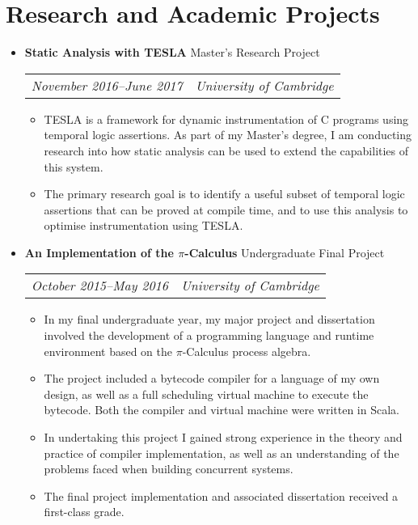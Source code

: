 \documentclass[letterpaper]{article}
\begin{document}
\section*{Research and Academic Projects}
  \begin{itemize}
    \item \textbf{Static Analysis with TESLA} Master's Research Project \\
      \begin{tabular}{c|c}
        \emph{November 2016--June 2017} & \emph{University of Cambridge}
      \end{tabular}
      \begin{itemize}
        \item TESLA is a framework for dynamic instrumentation of C programs
          using temporal logic assertions. As part of my Master's degree, I am
          conducting research into how static analysis can be used to extend the
          capabilities of this system.

        \item The primary research goal is to identify a useful subset of
          temporal logic assertions that can be proved at compile time, and to
          use this analysis to optimise instrumentation using TESLA.
      \end{itemize}

    \item \textbf{An Implementation of the $\pi$-Calculus} Undergraduate Final
      Project \\
        \begin{tabular}{c|c}
            \emph{October 2015--May 2016} & \emph{University of Cambridge}
        \end{tabular}
        \begin{itemize}
            \item In my final undergraduate year, my major project and
              dissertation involved the development of a programming language
              and runtime environment based on the $\pi$-Calculus process
              algebra.

            \item The project included a bytecode compiler for a language of my
              own design, as well as a full scheduling virtual machine to
              execute the bytecode. Both the compiler and virtual machine were
              written in Scala.

            \item In undertaking this project I gained strong experience in the
              theory and practice of compiler implementation, as well as an
              understanding of the problems faced when building concurrent
              systems.

            \item The final project implementation and associated dissertation
              received a first-class grade.
        \end{itemize}
  \end{itemize}
\end{document}
